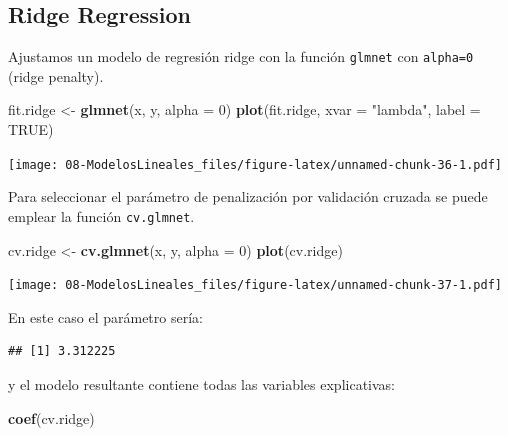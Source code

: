 \documentclass[]{book}
\newenvironment{Shaded}{\begin{snugshade}}{\end{snugshade}}
\newcommand{\KeywordTok}[1]{\textcolor[rgb]{0.13,0.29,0.53}{\textbf{#1}}}
\newcommand{\DataTypeTok}[1]{\textcolor[rgb]{0.13,0.29,0.53}{#1}}
\newcommand{\DecValTok}[1]{\textcolor[rgb]{0.00,0.00,0.81}{#1}}
\newcommand{\StringTok}[1]{\textcolor[rgb]{0.31,0.60,0.02}{#1}}
\newcommand{\OtherTok}[1]{\textcolor[rgb]{0.56,0.35,0.01}{#1}}
\newcommand{\OperatorTok}[1]{\textcolor[rgb]{0.81,0.36,0.00}{\textbf{#1}}}
\newcommand{\NormalTok}[1]{#1}
\begin{document}
\subsection{Ridge Regression}\label{ridge-regression}

Ajustamos un modelo de regresión ridge con la función \texttt{glmnet}
con \texttt{alpha=0} (ridge penalty).

\begin{Shaded}
\begin{Highlighting}[]
\NormalTok{fit.ridge <-}\StringTok{ }\KeywordTok{glmnet}\NormalTok{(x, y, }\DataTypeTok{alpha =} \DecValTok{0}\NormalTok{)}
\KeywordTok{plot}\NormalTok{(fit.ridge, }\DataTypeTok{xvar =} \StringTok{"lambda"}\NormalTok{, }\DataTypeTok{label =} \OtherTok{TRUE}\NormalTok{)}
\end{Highlighting}
\end{Shaded}

\texttt{[image: 08-ModelosLineales\_files/figure-latex/unnamed-chunk-36-1.pdf]}

Para seleccionar el parámetro de penalización por validación cruzada se
puede emplear la función \texttt{cv.glmnet}.

\begin{Shaded}
\begin{Highlighting}[]
\NormalTok{cv.ridge <-}\StringTok{ }\KeywordTok{cv.glmnet}\NormalTok{(x, y, }\DataTypeTok{alpha =} \DecValTok{0}\NormalTok{)}
\KeywordTok{plot}\NormalTok{(cv.ridge)}
\end{Highlighting}
\end{Shaded}

\texttt{[image: 08-ModelosLineales\_files/figure-latex/unnamed-chunk-37-1.pdf]}

En este caso el parámetro sería:

\begin{Shaded}
\end{Shaded}

\begin{verbatim}
## [1] 3.312225
\end{verbatim}

y el modelo resultante contiene todas las variables explicativas:

\begin{Shaded}
\begin{Highlighting}[]
\KeywordTok{coef}\NormalTok{(cv.ridge)}
\end{Highlighting}
\end{Shaded}
\end{document}
